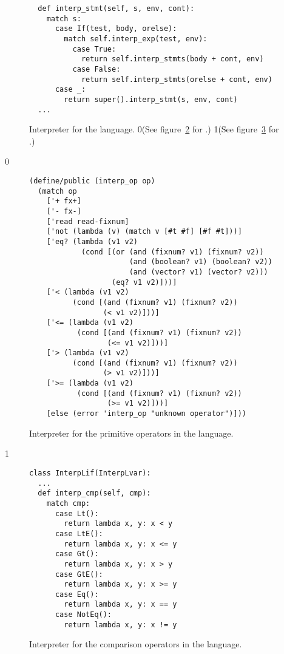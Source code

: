 \documentclass[7x10]{TimesAPriori_MIT}%
\def\racketEd{0}
\def\pythonEd{1}
\def\edition{1}
\newcommand{\racket}[1]{{\if\edition\racketEd{#1}\fi}}
\newcommand{\pythonColor}[0]{}
\newcommand{\python}[1]{{\if\edition\pythonEd\pythonColor #1\fi}}
\numberwithin{theorem}{chapter}
\numberwithin{definition}{chapter}
\numberwithin{equation}{chapter}
\begin{document}
\begin{figure}[tbp]
\begin{tcolorbox}[colback=white]
{\begin{lstlisting}
  def interp_stmt(self, s, env, cont):
    match s:
      case If(test, body, orelse):
        match self.interp_exp(test, env):
          case True:
            return self.interp_stmts(body + cont, env)
          case False:
            return self.interp_stmts(orelse + cont, env)
      case _:
        return super().interp_stmt(s, env, cont)
  ...      
\end{lstlisting}
\fi}
\end{tcolorbox}
\caption{Interpreter for the \LangIf{} language. \racket{(See
    figure~\ref{fig:interp-op-Lif} for \code{interp-op}.)}
  \python{(See figure~\ref{fig:interp-cmp-Lif} for \code{interp\_cmp}.)}}
\label{fig:interp-Lif}
\end{figure}

{\if\edition\racketEd
\begin{figure}[tbp]
\begin{tcolorbox}[colback=white]    
\begin{lstlisting}
(define/public (interp_op op)
  (match op
    ['+ fx+]
    ['- fx-]
    ['read read-fixnum]
    ['not (lambda (v) (match v [#t #f] [#f #t]))]
    ['eq? (lambda (v1 v2)
            (cond [(or (and (fixnum? v1) (fixnum? v2))
                       (and (boolean? v1) (boolean? v2))
                       (and (vector? v1) (vector? v2)))
                   (eq? v1 v2)]))]
    ['< (lambda (v1 v2)
          (cond [(and (fixnum? v1) (fixnum? v2))
                 (< v1 v2)]))]
    ['<= (lambda (v1 v2)
           (cond [(and (fixnum? v1) (fixnum? v2))
                  (<= v1 v2)]))]
    ['> (lambda (v1 v2)
          (cond [(and (fixnum? v1) (fixnum? v2))
                 (> v1 v2)]))]
    ['>= (lambda (v1 v2)
           (cond [(and (fixnum? v1) (fixnum? v2))
                  (>= v1 v2)]))]
    [else (error 'interp_op "unknown operator")]))
\end{lstlisting}
\end{tcolorbox}

\caption{Interpreter for the primitive operators in the \LangIf{} language.}
\label{fig:interp-op-Lif}
\end{figure}
\fi}

{\if\edition\pythonEd\pythonColor
\begin{figure}
\begin{tcolorbox}[colback=white]
\begin{lstlisting}
class InterpLif(InterpLvar):
  ...
  def interp_cmp(self, cmp):
    match cmp:
      case Lt():
        return lambda x, y: x < y
      case LtE():
        return lambda x, y: x <= y
      case Gt():
        return lambda x, y: x > y
      case GtE():
        return lambda x, y: x >= y
      case Eq():
        return lambda x, y: x == y
      case NotEq():
        return lambda x, y: x != y
\end{lstlisting}
\end{tcolorbox}

\caption{Interpreter for the comparison operators in the \LangIf{} language.}
\label{fig:interp-cmp-Lif}
\end{figure}
\fi}
\end{document}
